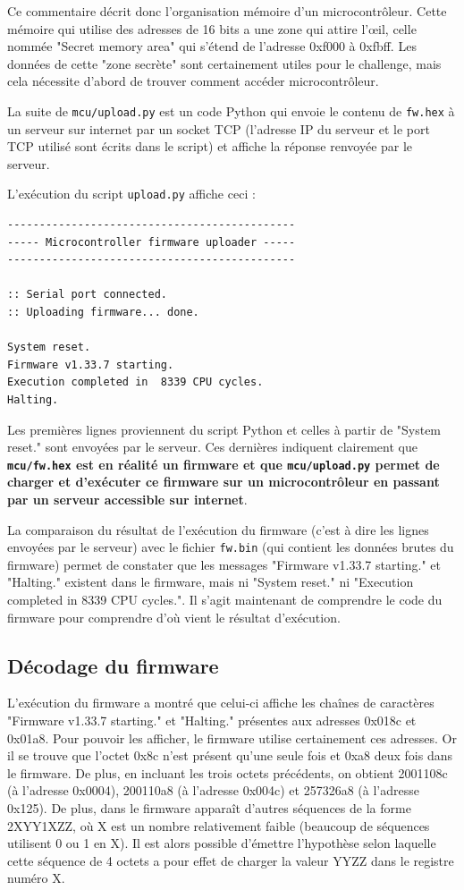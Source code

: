 \documentclass[a4paper,10pt]{article}
\begin{document}
Ce commentaire décrit donc l'organisation mémoire d'un microcontrôleur. Cette mémoire qui utilise des adresses de 16 bits a une zone qui attire l'\oe{}il, celle nommée "Secret memory area" qui s'étend de l'adresse 0xf000 à 0xfbff. Les données de cette "zone secrète" sont certainement utiles pour le challenge, mais cela nécessite d'abord de trouver comment accéder microcontrôleur.

La suite de \texttt{mcu/upload.py} est un code Python qui envoie le contenu de \texttt{fw.hex} à un serveur sur internet par un socket TCP (l'adresse IP du serveur et le port TCP utilisé sont écrits dans le script) et affiche la réponse renvoyée par le serveur.

L'exécution du script \texttt{upload.py} affiche ceci :
\begin{verbatim}
---------------------------------------------
----- Microcontroller firmware uploader -----
---------------------------------------------

:: Serial port connected.
:: Uploading firmware... done.

System reset.
Firmware v1.33.7 starting.
Execution completed in  8339 CPU cycles.
Halting.
\end{verbatim}

Les premières lignes proviennent du script Python et celles à partir de "System reset." sont envoyées par le serveur. Ces dernières indiquent clairement que \textbf{\texttt{mcu/fw.hex} est en réalité un firmware et que \texttt{mcu/upload.py} permet de charger et d'exécuter ce firmware sur un microcontrôleur en passant par un serveur accessible sur internet}.

La comparaison du résultat de l'exécution du firmware (c'est à dire les lignes envoyées par le serveur) avec le fichier \texttt{fw.bin} (qui contient les données brutes du firmware) permet de constater que les messages "Firmware v1.33.7 starting." et "Halting." existent dans le firmware, mais ni "System reset." ni "Execution completed in  8339 CPU cycles.". Il s'agit maintenant de comprendre le code du firmware pour comprendre d'où vient le résultat d'exécution.


\subsection{Décodage du firmware}
\label{fwdecoding}

L'exécution du firmware a montré que celui-ci affiche les chaînes de caractères "Firmware v1.33.7 starting." et "Halting." présentes aux adresses 0x018c et 0x01a8. Pour pouvoir les afficher, le firmware utilise certainement ces adresses. Or il se trouve que l'octet 0x8c n'est présent qu'une seule fois et 0xa8 deux fois dans le firmware. De plus, en incluant les trois octets précédents, on obtient 2001108c (à l'adresse 0x0004), 200110a8 (à l'adresse 0x004c) et 257326a8 (à l'adresse 0x125). De plus, dans le firmware apparaît d'autres séquences de la forme 2XYY1XZZ, où X est un nombre relativement faible (beaucoup de séquences utilisent 0 ou 1 en X). Il est alors possible d'émettre l'hypothèse selon laquelle cette séquence de 4 octets a pour effet de charger la valeur YYZZ dans le registre numéro X.
\end{document}
